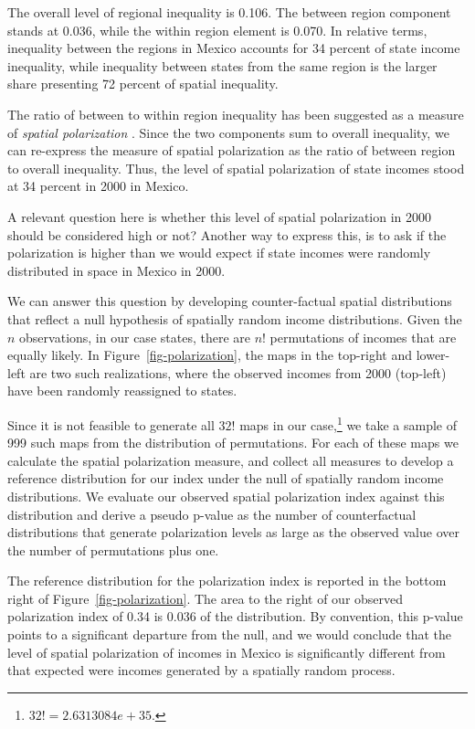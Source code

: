 \documentclass[
  a4paper, 
  twoside,
  final
]{article}
\begin{document}
The overall level of regional inequality is 0.106. The between region
component stands at 0.036, while the within region element is 0.070. In
relative terms, inequality between the regions in Mexico accounts for 34
percent of state income inequality, while inequality between states from
the same region is the larger share presenting 72 percent of spatial
inequality.

The ratio of between to within region inequality has been suggested as a
measure of \emph{spatial polarization} \citep{zhang2001WhatDifference}.
Since the two components sum to overall inequality, we can re-express
the measure of spatial polarization as the ratio of between region to
overall inequality. Thus, the level of spatial polarization of state
incomes stood at 34 percent in 2000 in Mexico.

A relevant question here is whether this level of spatial polarization
in 2000 should be considered high or not? Another way to express this,
is to ask if the polarization is higher than we would expect if state
incomes were randomly distributed in space in Mexico in 2000.

We can answer this question by developing counter-factual spatial
distributions that reflect a null hypothesis of spatially random income
distributions. Given the \(n\) observations, in our case states, there
are \(n!\) permutations of incomes that are equally likely. In
Figure~\ref{fig-polarization}, the maps in the top-right and lower-left
are two such realizations, where the observed incomes from 2000
(top-left) have been randomly reassigned to states.

Since it is not feasible to generate all \(32!\) maps in our
case,\footnote{\(32! = 2.6313084e+35\).} we take a sample of 999 such
maps from the distribution of permutations. For each of these maps we
calculate the spatial polarization measure, and collect all measures to
develop a reference distribution for our index under the null of
spatially random income distributions. We evaluate our observed spatial
polarization index against this distribution and derive a pseudo p-value
as the number of counterfactual distributions that generate polarization
levels as large as the observed value over the number of permutations
plus one.

The reference distribution for the polarization index is reported in the
bottom right of Figure~\ref{fig-polarization}. The area to the right of
our observed polarization index of 0.34 is 0.036 of the distribution. By
convention, this p-value points to a significant departure from the
null, and we would conclude that the level of spatial polarization of
incomes in Mexico is significantly different from that expected were
incomes generated by a spatially random process.
\end{document}
